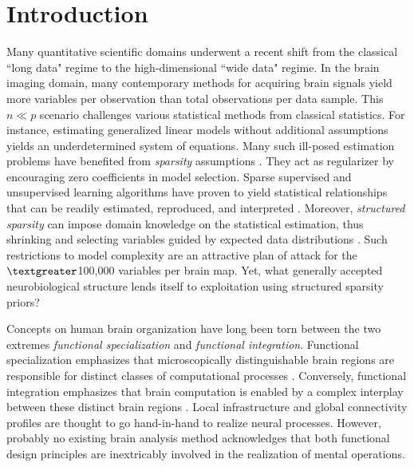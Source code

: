 \documentclass{article}
\begin{document}
\section{Introduction}
Many quantitative scientific domains underwent a
recent shift from the classical ``long data" regime to
the high-dimensional ``wide data" regime.
In the brain imaging domain,
many contemporary methods for acquiring brain signals yield
more variables per observation than
total observations per data sample.
This $n \ll p$ scenario challenges various statistical methods from
classical statistics.
For instance,
estimating generalized linear models without additional assumptions
yields an underdetermined system of equations.
%
Many such ill-posed estimation problems
have benefited from
\textit{sparsity} assumptions
\cite{hastie2015statistical}.
They act as regularizer by encouraging zero coefficients
in model selection.
Sparse supervised and unsupervised
learning algorithms have proven to yield
statistical relationships that can be readily
estimated, reproduced, and interpreted
\cite{giraud2014introduction}.
%
Moreover, \textit{structured sparsity} can impose
domain knowledge on the 
statistical estimation,
thus shrinking and selecting variables guided by
expected data distributions
\cite{bach2012optimization}.
Such restrictions to model complexity
are an attractive plan of attack
for the $\textgreater$100,000 variables per brain map.
Yet, what generally accepted neurobiological structure lends itself
to exploitation using structured sparsity priors?



Concepts on human brain organization have long been torn
between the two extremes
\textit{functional specialization} and \textit{functional integration}.
Functional specialization emphasizes that microscopically distinguishable
brain regions are responsible for distinct classes of computational 
processes
\cite{kanwisher2010functional}.
Conversely, functional integration emphasizes that brain computation
is enabled by a complex interplay between these
distinct brain regions \cite{sporns14nn}.
%
Local
infrastructure
and global connectivity profiles are thought to go hand-in-hand
to realize neural processes.
%
However,
probably no existing brain analysis method acknowledges that
both functional design principles are inextricably involved
in the realization of mental operations.
\end{document}

